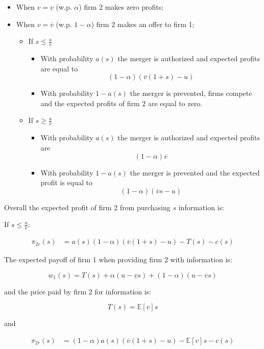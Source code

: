 \documentclass[a4paper,leqno]{article}%
\newcommand{\E}{\mathbb E}
\renewcommand{\a}{\alpha}
\newcommand{\uv}{\underline{v}}
\newcommand{\ov}{\overline{v}}
\begin{document}
\begin{itemize}
    \item When $v=\uv$ (w.p. $\a$) firm 2 makes zero profits;
    \item When $v=\ov$ (w.p. $1-\a$) firm 2 makes an offer to firm 1;
    \begin{itemize}
    \item If $s\leq\frac{u}{\ov}$
    \begin{itemize}
        \item With probability $a(s)$ the merger is authorized and expected profits are equal to $$(1-\a)(\ov(1+s)-u)$$
        \item With probability $1-a(s)$ the merger is prevented, firms compete and the expected profits of firm 2 are equal to zero.
    \end{itemize}
    \item If $s\geq\frac{u}{\ov}$
    \begin{itemize}
        \item With probability $a(s)$ the merger is authorized and expected profits are
        $$(1-\a)\ov$$
        \item With probability $1-a(s)$ the merger is prevented and the expected profit is equal to $$(1-\a)(\ov s-u)$$
    \end{itemize} 
    \end{itemize}
\end{itemize}

Overall the expected profit of firm 2 from purchasing $s$ information is:

If $s\leq\frac{u}{\ov}$:

\begin{equation}
    \begin{aligned}
\pi_{2r}(s)&=a(s)(1-\a)(\ov(1+s)-u)-T(s)-c(s)
\end{aligned}
\end{equation}

The expected payoff of firm 1 when providing firm 2 with information is:

$$w_1(s)=T(s)+\a(u-\uv s)+(1-\a)(u-\ov s)$$

and the price paid by firm 2 for information is:

$$T(s)=\E[v]s$$

and 

\begin{equation}
    \begin{aligned}
\pi_{2r}(s)&=(1-\a)a(s)(\ov(1+s)-u)-\E[v]s-c(s)\\
\end{aligned}
\end{equation}
\end{document}
